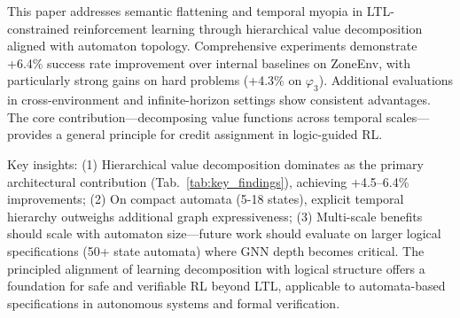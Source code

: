 \documentclass[journal]{IEEEtran}
\begin{document}
This paper addresses semantic flattening and temporal myopia in LTL-constrained reinforcement learning through hierarchical value decomposition aligned with automaton topology. Comprehensive experiments demonstrate +6.4\% success rate improvement over internal baselines on ZoneEnv, with particularly strong gains on hard problems (+4.3\% on $\varphi_3$). Additional evaluations in cross-environment and infinite-horizon settings show consistent advantages. The core contribution—decomposing value functions across temporal scales—provides a general principle for credit assignment in logic-guided RL.

Key insights: (1) Hierarchical value decomposition dominates as the primary architectural contribution (Tab.~\ref{tab:key_findings}), achieving +4.5--6.4\% improvements; (2) On compact automata (5-18 states), explicit temporal hierarchy outweighs additional graph expressiveness; (3) Multi-scale benefits should scale with automaton size—future work should evaluate on larger logical specifications (50+ state automata) where GNN depth becomes critical. The principled alignment of learning decomposition with logical structure offers a foundation for safe and verifiable RL beyond LTL, applicable to automata-based specifications in autonomous systems and formal verification.






%
\end{document}
